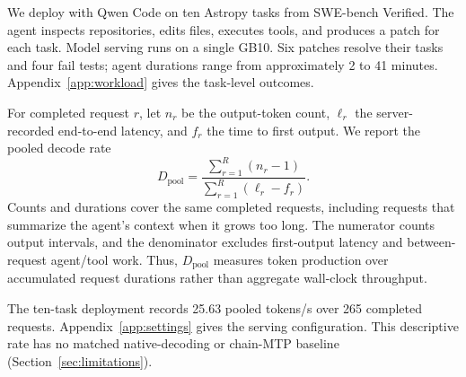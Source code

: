 We deploy \sys{} with Qwen Code on ten Astropy tasks from SWE-bench Verified. The agent inspects repositories, edits files, executes tools, and produces a patch for each task. Model serving runs on a single GB10. Six patches resolve their tasks and four fail tests; agent durations range from approximately 2 to 41 minutes. Appendix~\ref{app:workload} gives the task-level outcomes.

For completed request $r$, let $n_r$ be the output-token count, $\ell_r$ the server-recorded end-to-end latency, and $f_r$ the time to first output. We report the pooled decode rate
\begin{equation}
 D_{\mathrm{pool}} =
 \frac{\sum_{r=1}^{R}(n_r-1)}{\sum_{r=1}^{R}(\ell_r-f_r)}.
 \label{eq:pooled-decode}
\end{equation}
Counts and durations cover the same completed requests, including requests that summarize the agent's context when it grows too long. The numerator counts output intervals, and the denominator excludes first-output latency and between-request agent/tool work. Thus, $D_{\mathrm{pool}}$ measures token production over accumulated request durations rather than aggregate wall-clock throughput.

The ten-task deployment records 25.63 pooled tokens/s over 265 completed requests. Appendix~\ref{app:settings} gives the serving configuration. This descriptive rate has no matched native-decoding or chain-MTP baseline (Section~\ref{sec:limitations}).
